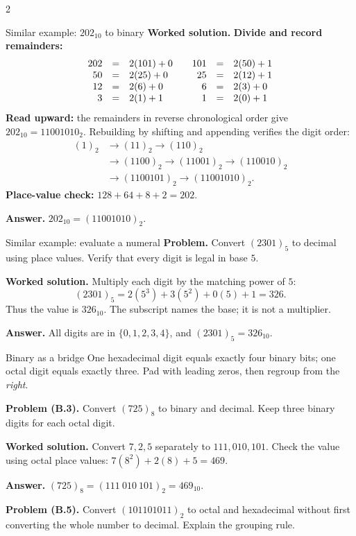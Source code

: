 \documentclass[10pt]{article}
\begin{document}
\begin{multicols}{2}
\begin{workedbox}{Similar example: $202_{10}$ to binary}
\textbf{Worked solution.} \textbf{Divide and record remainders:}
\[
\begin{array}{rcl@{\qquad}rcl}
202&=&2(101)+0 & 101&=&2(50)+1\\
50&=&2(25)+0 & 25&=&2(12)+1\\
12&=&2(6)+0 & 6&=&2(3)+0\\
3&=&2(1)+1 & 1&=&2(0)+1
\end{array}
\]
\textbf{Read upward:} the remainders in reverse chronological order give
$202_{10}=11001010_2$. Rebuilding by shifting and
appending verifies the digit order:
\[
\begin{aligned}
(1)_2&\to(11)_2\to(110)_2\\
&\to(1100)_2\to(11001)_2\to(110010)_2\\
&\to(1100101)_2\to(11001010)_2.
\end{aligned}
\]
\textbf{Place-value check:} $128+64+8+2=202$.

\textbf{Answer.} $202_{10}=(11001010)_2$.
\end{workedbox}


\begin{workedbox}{Similar example: evaluate a numeral}
\textbf{Problem.} Convert $(2301)_5$ to decimal using place values. Verify that every digit is legal in base $5$.

\textbf{Worked solution.} Multiply each digit by the matching power of $5$:
\[
(2301)_5=2(5^3)+3(5^2)+0(5)+1=326.
\]
Thus the value is $326_{10}$. The subscript names the base; it is not a
multiplier.

\textbf{Answer.} All digits are in $\{0,1,2,3,4\}$, and $(2301)_5=326_{10}$.
\end{workedbox}

\begin{methodbox}{Binary as a bridge}
One hexadecimal digit equals exactly four binary bits; one octal digit equals
exactly three. Pad with leading zeros, then regroup from the \emph{right}.

\textbf{Problem (B.3).} Convert $(725)_8$ to binary and decimal. Keep three binary digits for each octal digit.

\textbf{Worked solution.} Convert $7,2,5$ separately to $111,010,101$. Check the value using octal place values: $7(8^2)+2(8)+5=469$.

\textbf{Answer.} $(725)_8=(111\ 010\ 101)_2=469_{10}$.

\textbf{Problem (B.5).} Convert $(101101011)_2$ to octal and hexadecimal without first converting the whole number to decimal. Explain the grouping rule.


\end{methodbox}
\end{multicols}
\end{document}

